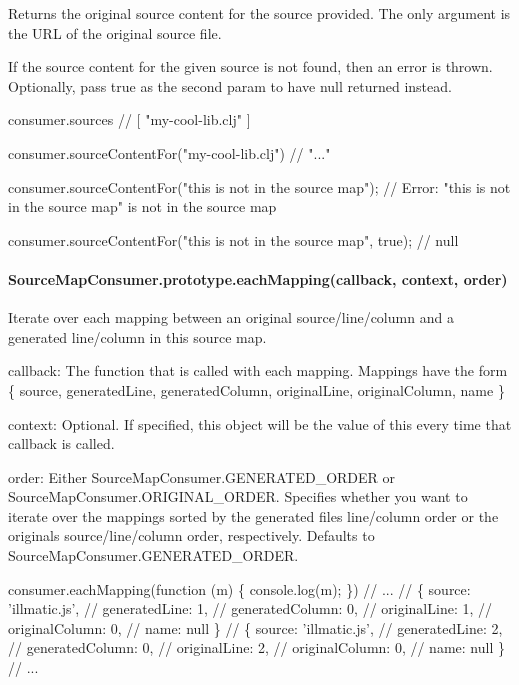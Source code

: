 Returns the original source content for the source provided. The only argument is the U\+RL of the original source file.

If the source content for the given source is not found, then an error is thrown. Optionally, pass {\ttfamily true} as the second param to have {\ttfamily null} returned instead.


\begin{DoxyCode}
consumer.sources
// [ "my-cool-lib.clj" ]

consumer.sourceContentFor("my-cool-lib.clj")
// "..."

consumer.sourceContentFor("this is not in the source map");
// Error: "this is not in the source map" is not in the source map

consumer.sourceContentFor("this is not in the source map", true);
// null
\end{DoxyCode}


\paragraph*{Source\+Map\+Consumer.\+prototype.\+each\+Mapping(callback, context, order)}

Iterate over each mapping between an original source/line/column and a generated line/column in this source map.


\begin{DoxyItemize}
\item {\ttfamily callback}\+: The function that is called with each mapping. Mappings have the form {\ttfamily \{ source, generated\+Line, generated\+Column, original\+Line, original\+Column, name \}}
\item {\ttfamily context}\+: Optional. If specified, this object will be the value of {\ttfamily this} every time that {\ttfamily callback} is called.
\item {\ttfamily order}\+: Either {\ttfamily Source\+Map\+Consumer.\+G\+E\+N\+E\+R\+A\+T\+E\+D\+\_\+\+O\+R\+D\+ER} or {\ttfamily Source\+Map\+Consumer.\+O\+R\+I\+G\+I\+N\+A\+L\+\_\+\+O\+R\+D\+ER}. Specifies whether you want to iterate over the mappings sorted by the generated file\textquotesingle{}s line/column order or the original\textquotesingle{}s source/line/column order, respectively. Defaults to {\ttfamily Source\+Map\+Consumer.\+G\+E\+N\+E\+R\+A\+T\+E\+D\+\_\+\+O\+R\+D\+ER}.
\end{DoxyItemize}


\begin{DoxyCode}
consumer.eachMapping(function (m) \{ console.log(m); \})
// ...
// \{ source: 'illmatic.js',
//   generatedLine: 1,
//   generatedColumn: 0,
//   originalLine: 1,
//   originalColumn: 0,
//   name: null \}
// \{ source: 'illmatic.js',
//   generatedLine: 2,
//   generatedColumn: 0,
//   originalLine: 2,
//   originalColumn: 0,
//   name: null \}
// ...
\end{DoxyCode}
